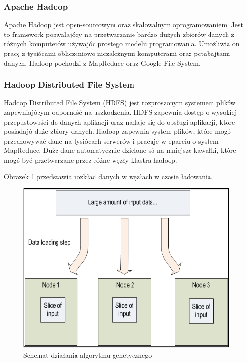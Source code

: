 \subsubsection{Apache Hadoop}
\label{ssub:apache_hadoop}
Apache Hadoop jest open-sourcowym oraz skalowalnym oprogramowaniem. Jest to framework pozwalajócy na przetwarzanie bardzo dużych zbiorów danych z różnych komputerów używajóc prostego modelu programowania. Umożliwia on pracę z tysiócami obliczeniowo niezależnymi komputerami oraz petabajtami danych. Hadoop pochodzi z MapReduce oraz Google File System.

\subsubsection{Hadoop Distributed File System}
\label{ssub:hdfs}
Hadoop Distributed File System (HDFS) jest rozproszonym systemem plików zapewniajócym odporność na uszkodzenia. HDFS zapewnia dostęp o wysokiej przepustowości do danych aplikacji oraz nadaje się do obsługi aplikacji, które posiadajó duże zbiory danych. Hadoop zapewnia system plików, które mogó przechowywać dane na tysiócach serwerów i pracuje w oparciu o system MapReduce. Duże dane automatycznie dzielone só na mniejsze kawałki, które mogó być przetwarzane przez różne węzły klastra hadoop.

Obrazek \ref{fig:rozklad_danych} przedstawia rozkład danych w węzłach w czasie ładowania.

\begin{figure}[h]
\centerline{\includegraphics[scale=0.5]{obrazki/rozklad_danych.png}}
\caption{Schemat działania algorytmu genetycznego}
\label{fig:rozklad_danych}
\end{figure}

